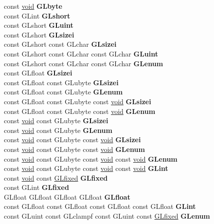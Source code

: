 \begin{DoxyCompactItemize}
\begin{tabbing}
\>const \hyperlink{interfacevoid}{void} {\bfseries GLbyte}\\
\>const GLint {\bfseries GLshort}\\
\>const GLshort {\bfseries GLuint}\\
\>const GLshort {\bfseries GLsizei}\\
\>const GLshort const GLchar {\bfseries GLsizei}\\
\>const GLshort const GLchar const GLchar {\bfseries GLuint}\\
\>const GLshort const GLchar const GLchar {\bfseries GLenum}\\
\>const GLfloat {\bfseries GLsizei}\\
\>const GLfloat const GLubyte {\bfseries GLsizei}\\
\>const GLfloat const GLubyte {\bfseries GLenum}\\
\>const GLfloat const GLubyte const \hyperlink{interfacevoid}{void} {\bfseries GLsizei}\\
\>const GLfloat const GLubyte const \hyperlink{interfacevoid}{void} {\bfseries GLenum}\\
\>const \hyperlink{interfacevoid}{void} const GLubyte {\bfseries GLsizei}\\
\>const \hyperlink{interfacevoid}{void} const GLubyte {\bfseries GLenum}\\
\>const \hyperlink{interfacevoid}{void} const GLubyte const \hyperlink{interfacevoid}{void} {\bfseries GLsizei}\\
\>const \hyperlink{interfacevoid}{void} const GLubyte const \hyperlink{interfacevoid}{void} {\bfseries GLenum}\\
\>const \hyperlink{interfacevoid}{void} const GLubyte const \hyperlink{interfacevoid}{void} const \hyperlink{interfacevoid}{void} {\bfseries GLenum}\\
\>const \hyperlink{interfacevoid}{void} const GLubyte const \hyperlink{interfacevoid}{void} const \hyperlink{interfacevoid}{void} {\bfseries GLint}\\
\>const \hyperlink{interfacevoid}{void} const \hyperlink{glheader_8h_ad6d3fa892df40dedf48ee6d84529ae5e}{GLfixed} {\bfseries GLfixed}\\
\>const GLint {\bfseries GLfixed}\\
\>GLfloat GLfloat GLfloat GLfloat {\bfseries GLfloat}\\
\>const GLfloat const GLfloat const GLfloat const GLfloat {\bfseries GLint}\\
\>const GLuint const GLclampf const GLuint const \hyperlink{glheader_8h_ad6d3fa892df40dedf48ee6d84529ae5e}{GLfixed} {\bfseries GLenum}\\

\end{tabbing}
\end{DoxyCompactItemize}

